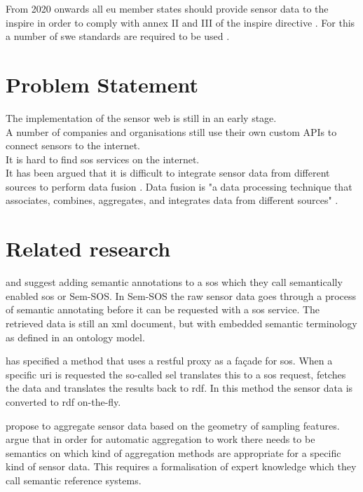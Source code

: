 From 2020 onwards all \ac{eu} member states should provide sensor data to the \ac{inspire} in order to comply with annex II and III of the \ac{inspire} directive \citep{SDI:INSPIRE5}. For this a number of \ac{swe} standards are required to be used \citep{SDI:INSPIRE2}. \\

\section{Problem Statement}
The implementation of the sensor web is still in an early stage. \\

A number of companies and organisations still use their own custom APIs to connect sensors to the internet. \\

It is hard to find \ac{sos} services on the internet. \\

It has been argued that it is difficult to integrate sensor data from different sources to perform data fusion \citep{SSW:Corcho, SSW:Ji, SSW:Wang}. Data fusion is "a data processing technique that associates, combines, aggregates, and integrates data from different sources" \cite[p. 2]{SSW:Perera}. \\


\section{Related research}
\cite{SSW:Henson} and \cite{SSW:Pschorr} suggest adding semantic annotations to a \ac{sos} which they call semantically enabled \ac{sos} or Sem-SOS. In Sem-SOS the raw sensor data goes through a process of semantic annotating before it can be requested with a \ac{sos} service. The retrieved data is still an \ac{xml} document, but with embedded semantic terminology as defined in an ontology model. 

\cite{SSW:Janowicz} has specified a method that uses a \ac{rest}ful proxy as a fa\c{c}ade for \ac{sos}. When a specific \ac{uri} is requested the so-called \ac{sel} translates this to a \ac{sos} request, fetches the data and translates the results back to \ac{rdf}. In this method the sensor data is converted to \ac{rdf} on-the-fly.  

\cite{SSW:Stasch} propose to aggregate sensor data based on the geometry of sampling features. \cite{SSW:Stasch4} argue that in order for automatic aggregation to work there needs to be semantics on which kind of aggregation methods are appropriate for a specific kind of sensor data. This requires a formalisation of expert knowledge which they call semantic reference systems.

